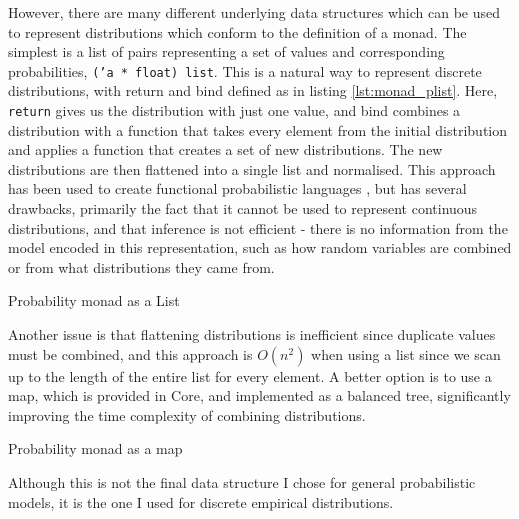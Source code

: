However, there are many different underlying data structures which can be used to represent distributions which conform to the definition of a monad. The simplest is a list of pairs representing a set of values and corresponding probabilities, \texttt{('a * float) list}. This is a natural way to represent discrete distributions, with return and bind defined as in listing \ref{lst:monad_plist}. Here, \texttt{return} gives us the distribution with just one value, and bind combines a distribution with a function that takes every element from the initial distribution and applies a function that creates a set of new distributions. The new distributions are then flattened into a single list and normalised. This approach has been used to create functional probabilistic languages \cite{erwig}, but has several drawbacks, primarily the fact that it cannot be used to represent continuous distributions, and that inference is not efficient - there is no information from the model encoded in this representation, such as how random variables are combined or from what distributions they came from.

\begin{listing}[!ht]
	\caption{Probability monad as a List}
	\label{lst:monad_plist}
\end{listing}
	
Another issue is that flattening distributions is inefficient since duplicate values must be combined, and this approach is $O(n^2)$ when using a list since we scan up to the length of the entire list for every element. A better option is to use a map, which is provided in Core, and implemented as a balanced tree, significantly improving the time complexity of combining distributions.
	
\begin{listing}[!ht]
	\caption{Probability monad as a map}
	\label{lst:monad_pmap}
\end{listing}
	
Although this is not the final data structure I chose for general probabilistic models, it is the one I used for discrete empirical distributions.
	
